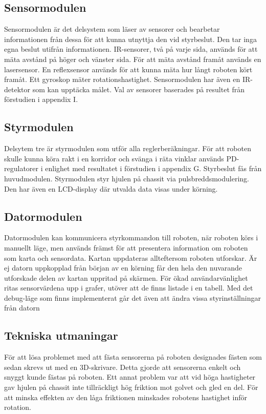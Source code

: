 \documentclass[11pt]{article}
\begin{document}
\begin{flushleft}
\subsection{Sensormodulen}
Sensormodulen är det delsystem som läser av sensorer och bearbetar informationen från dessa för att kunna utnyttja den vid styrbeslut. Den tar inga egna beslut utifrån informationen. IR-sensorer, två på varje sida, används för att mäta avstånd på höger och vänster sida. För att mäta avstånd framåt används en lasersensor. En reflexsensor används för att kunna mäta hur långt roboten kört framåt. Ett gyroskop mäter rotationshastighet. Sensormodulen har även en IR-detektor som kan upptäcka målet. Val av sensorer baserades på resultet från förstudien i appendix I. 

\subsection{Styrmodulen}
Delsytem tre är styrmodulen som utför alla reglerberäkningar. För att roboten skulle kunna köra rakt i en korridor och svänga i räta vinklar används PD-regulatorer i enlighet med resultatet i förstudien i appendix G. Styrbeslut fås från huvudmodulen. Styrmodulen styr hjulen på chassit via pulsbreddsmodulering. Den har även en LCD-display där utvalda data visas under körning. 

\subsection{Datormodulen}
Datormodulen kan kommunicera styrkommandon till roboten, när roboten körs i manuellt läge, men används främst för att presentera information om roboten som karta och sensordata. Kartan uppdateras allteftersom roboten utforskar. Är ej datorn uppkopplad från början av en körning får den hela den nuvarande utforskade delen av kartan uppritad på skärmen. För ökad användarvänlighet ritas sensorvärdena upp i grafer, utöver att de finns listade i en tabell. Med det debug-läge som finns implementerat går det även att ändra vissa styrinställningar från datorn

\subsection{Tekniska utmaningar}
För att lösa problemet med att fästa sensorerna på roboten designades fästen som sedan skrevs ut med en 3D-skrivare. Detta gjorde att sensorerna enkelt och snyggt kunde fästas på roboten. Ett annat problem var att vid höga hastigheter gav hjulen på chassit inte tillräckligt hög friktion mot golvet och gled en del. För att minska effekten av den låga friktionen minskades robotens hastighet inför rotation.


\end{flushleft}
\end{document}
